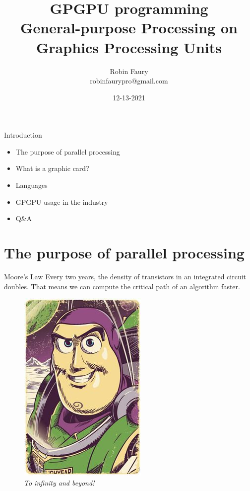 \documentclass{beamer}
\title{GPGPU programming\\General-purpose Processing on Graphics Processing Units}
\author{Robin Faury\\robinfaurypro@gmail.com}
\date{12-13-2021}
\begin{document}
\begin{frame}
\titlepage
\end{frame}

\begin{frame}{Introduction}
	\begin{itemize}
		\item The purpose of parallel processing
		\item What is a graphic card?
		\item Languages
		\item GPGPU usage in the industry
		\item Q\&A
	\end{itemize}
\end{frame}

\section{The purpose of parallel processing}
\begin{frame}{Moore's Law}
	Every two years, the density of transistors in an integrated circuit doubles. That means we can compute the critical path of an algorithm faster.
	\begin{figure}
		\includegraphics[scale=0.2]{figures/buzz1.jpg}
		\caption{\textit{To infinity and beyond!}}
	\end{figure}
\end{frame}
\end{document}
